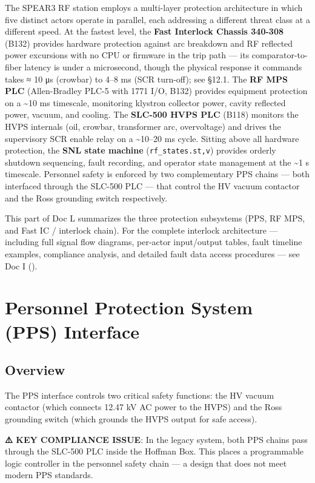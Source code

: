 The SPEAR3 RF station employs a multi-layer protection architecture in which five distinct actors operate in parallel, each addressing a different threat class at a different speed. At the fastest level, the \textbf{Fast Interlock Chassis 340-308} (B132) provides hardware protection against arc breakdown and RF reflected power excursions with no CPU or firmware in the trip path --- its comparator-to-fiber latency is under a microsecond, though the physical response it commands takes ≈ 10 μs (crowbar) to 4--8 ms (SCR turn-off); see §12.1. The \textbf{RF MPS PLC} (Allen-Bradley PLC-5 with 1771 I/O, B132) provides equipment protection on a \textasciitilde10 ms timescale, monitoring klystron collector power, cavity reflected power, vacuum, and cooling. The \textbf{SLC-500 HVPS PLC} (B118) monitors the HVPS internals (oil, crowbar, transformer arc, overvoltage) and drives the supervisory SCR enable relay on a \textasciitilde10--20 ms cycle. Sitting above all hardware protection, the \textbf{SNL state machine} (\texttt{rf\_states.st,v}) provides orderly shutdown sequencing, fault recording, and operator state management at the \textasciitilde1 s timescale. Personnel safety is enforced by two complementary PPS chains --- both interfaced through the SLC-500 PLC --- that control the HV vacuum contactor and the Ross grounding switch respectively.

This part of Doc L summarizes the three protection subsystems (PPS, RF MPS, and Fast IC / interlock chain). For the complete interlock architecture --- including full signal flow diagrams, per-actor input/output tables, fault timeline examples, compliance analysis, and detailed fault data access procedures --- see Doc I ().



\section{Personnel Protection System (PPS) Interface}

\subsection{Overview}

The PPS interface controls two critical safety functions: the HV vacuum contactor (which connects 12.47 kV AC power to the HVPS) and the Ross grounding switch (which grounds the HVPS output for safe access).

\textbf{⚠️ KEY COMPLIANCE ISSUE}: In the legacy system, both PPS chains pass through the SLC-500 PLC inside the Hoffman Box. This places a programmable logic controller in the personnel safety chain --- a design that does not meet modern PPS standards.

